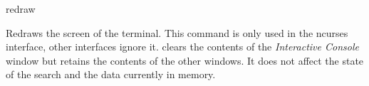 \begin{command}{redraw}{}

	\syntax{\obligatory{()}}

	\begin{poydescription}
        Redraws the screen of the terminal. This command is only used in the ncurses
        interface, other interfaces ignore it.  clears the
        contents of the \emph{Interactive Console} window but retains the contents
        of the other windows. It does not affect the state of the search and the data
        currently in memory.
	\end{poydescription}

    \begin{poyexamples}
    \end{poyexamples}

\end{command}

